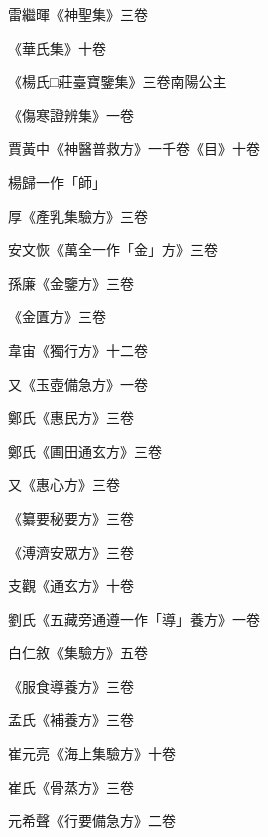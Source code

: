 \begin{pinyinscope}
 雷繼暉《神聖集》三卷



 《華氏集》十卷



 《楊氏□莊臺寶鑒集》三卷南陽公主



 《傷寒證辨集》一卷



 賈黃中《神醫普救方》一千卷《目》十卷



 楊歸一作「師」



 厚《產乳集驗方》三卷



 安文恢《萬全一作「金」方》三卷



 孫廉《金鑒方》三卷



 《金匱方》三卷



 韋宙《獨行方》十二卷



 又《玉壺備急方》一卷



 鄭氏《惠民方》三卷



 鄭氏《圃田通玄方》三卷



 又《惠心方》三卷



 《纂要秘要方》三卷



 《溥濟安眾方》三卷



 支觀《通玄方》十卷



 劉氏《五藏旁通遵一作「導」養方》一卷



 白仁敘《集驗方》五卷



 《服食導養方》三卷



 孟氏《補養方》三卷



 崔元亮《海上集驗方》十卷



 崔氏《骨蒸方》三卷



 元希聲《行要備急方》二卷




\end{pinyinscope}
